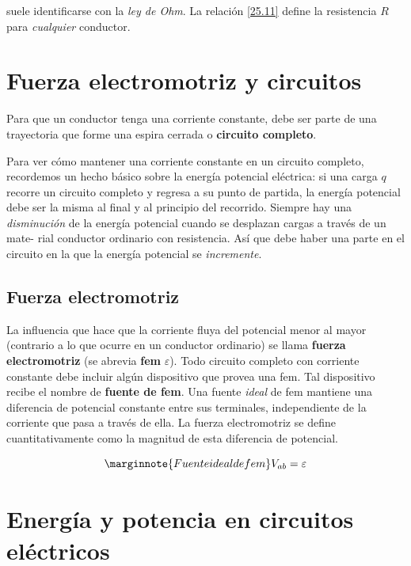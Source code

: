 suele identificarse con la \textit{ley de Ohm}. La relación \ref{25.11} define la resistencia $R$ para \textit{cualquier} conductor.

\section{Fuerza electromotriz y circuitos}
Para que un conductor tenga una corriente constante, debe ser parte de una trayectoria que forme una espira cerrada o \textbf{circuito completo}.

Para ver cómo mantener una corriente constante en un circuito completo, recordemos un hecho básico sobre la energía potencial eléctrica: si una carga $q$ recorre un circuito completo y regresa a su punto de partida, la energía potencial debe ser la misma al final y al principio del recorrido. Siempre hay una \textit{disminución} de la energía potencial cuando se desplazan cargas a través de un mate- rial conductor ordinario con resistencia. Así que debe haber una parte en el circuito en la que la energía potencial se \textit{incremente}.

\subsection{Fuerza electromotriz}
La influencia que hace que la corriente fluya del potencial menor al mayor (contrario a lo que ocurre en un conductor ordinario) se llama \textbf{fuerza electromotriz} (se abrevia \textbf{fem} $\varepsilon$).
Todo circuito completo con corriente constante debe incluir algún dispositivo que provea una fem. Tal dispositivo recibe el nombre de \textbf{fuente de fem}. Una fuente \textit{ideal} de fem mantiene una diferencia de potencial constante entre sus terminales, independiente de la corriente que pasa a través de ella. La fuerza electromotriz se define cuantitativamente como la magnitud de esta diferencia de potencial. 

\begin{equation}\label{25.13}\marginnote{Fuente ideal de fem}
V_{ab}=\varepsilon
\end{equation}

\section{Energía y potencia en circuitos eléctricos}

